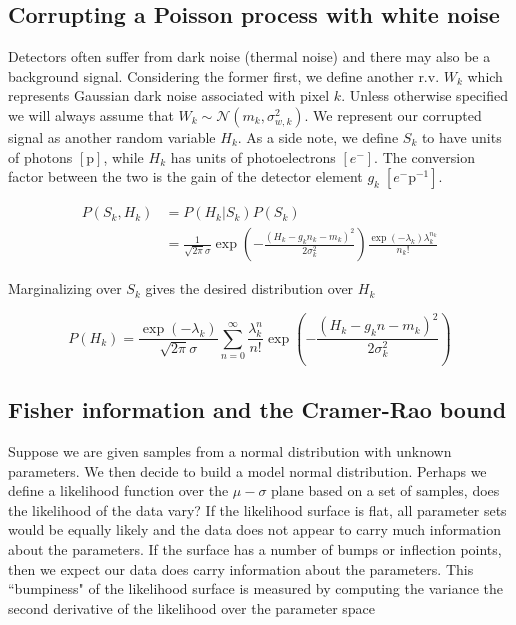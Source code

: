 \documentclass{ucetd}
\begin{document}
\subsection{Corrupting a Poisson process with white noise}

Detectors often suffer from dark noise (thermal noise) and there may also be a background signal. Considering the former first, we define another r.v. $W_{k}$ which represents Gaussian dark noise associated with pixel $k$. Unless otherwise specified we will always assume that $W_{k} \sim \mathcal{N}(m_{k},\sigma_{w,k}^{2})$. We represent our corrupted signal as another random variable $H_{k}$. As a side note, we define $S_{k}$ to have units of photons $[\mathrm{p}]$, while $H_{k}$ has units of photoelectrons $[e^{-}]$. The conversion factor between the two is the gain of the detector element $g_{k}\; [e^{-}\mathrm{p}^{-1}]$.

\vspace{0.1in}
\begin{align*}
P(S_{k},H_{k}) &= P(H_{k}|S_{k})P(S_{k})\\
&= \frac{1}{\sqrt{2\pi}\sigma}\exp\left(-\frac{(H_{k}-g_{k}n_{k}-m_{k})^{2}}{2\sigma_{k}^{2}}\right)\frac{\exp\left({-\lambda_{k}}\right)\lambda_{k}^{n_{k}}}{n_{k}!}
\end{align*}
\vspace{0.1in}

Marginalizing over $S_{k}$ gives the desired distribution over $H_{k}$

\begin{equation}
P(H_{k}) = \frac{\exp\left({-\lambda_{k}}\right)}{\sqrt{2\pi}\sigma}\sum_{n=0}^{\infty}\frac{\lambda_{k}^{n}}{n!}\exp\left(-\frac{(H_{k}-g_{k}n-m_{k})^{2}}{2\sigma_{k}^{2}}\right)
\end{equation}


\subsection{Fisher information and the Cramer-Rao bound}

Suppose we are given samples from a normal distribution with unknown parameters. We then decide to build a model normal distribution. Perhaps we define a likelihood function over the $\mu-\sigma$ plane based on a set of samples, does the likelihood of the data vary? If the likelihood surface is flat, all parameter sets would be equally likely and the data does not appear to carry much information about the parameters. If the surface has a number of bumps or inflection points, then we expect our data does carry information about the parameters. This ``bumpiness" of the likelihood surface is measured by computing the variance the second derivative of the likelihood over the parameter space\\
\end{document}
